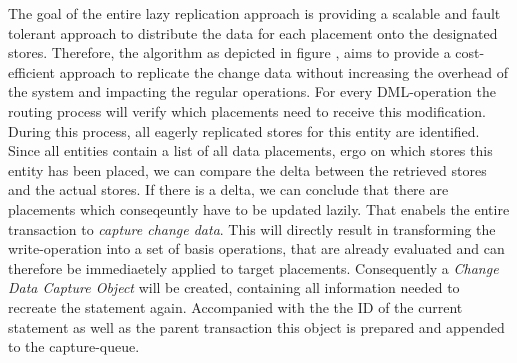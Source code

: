 The goal of the entire lazy replication approach is providing a scalable and fault tolerant approach to distribute the data for each placement onto the designated stores.
Therefore, the algorithm as depicted in figure , aims to provide a cost-efficient approach to replicate the change data without increasing the overhead
of the system and impacting the regular operations. 
For every DML-operation the routing process will verify which placements need to receive this modification. During this process, all eagerly replicated stores for this entity
are identified. Since all entities contain a list of all data placements, ergo on which stores this entity has been placed, 
we can compare the delta between the retrieved stores and the actual stores. 
If there is a delta, we can conclude that there are placements which conseqeuntly have to be updated lazily. 
That enabels the entire transaction to \emph{capture change data}. This will directly result in transforming the write-operation into a set of basis operations, 
that are already evaluated and can therefore be immediaetely applied to target placements. Consequently a \emph{Change Data Capture Object} will be created, 
containing all information needed to recreate the statement again. Accompanied with the the ID of the current statement as well as the parent transaction this object is prepared
and appended to the capture-queue.

